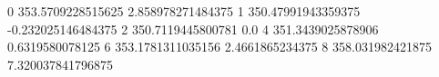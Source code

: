 0 353.5709228515625 2.858978271484375
1 350.47991943359375 -0.232025146484375
2 350.7119445800781 0.0
4 351.3439025878906 0.6319580078125
6 353.1781311035156 2.4661865234375
8 358.031982421875 7.320037841796875
